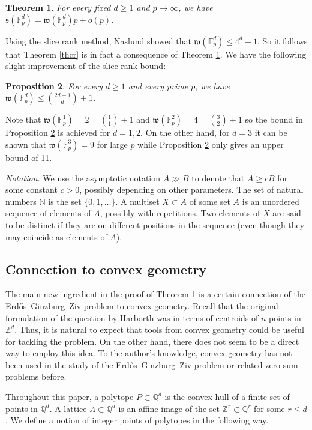 \documentclass{daj}
\renewcommand{\le}{\leqslant}
\renewcommand{\ge}{\geqslant}
\newcommand{\s}{\mathfrak s}
\newcommand{\w}{\mathfrak w}
\newcommand{\Q}{\mathbb Q}
\newcommand{\Z}{\mathbb Z}
\newcommand{\N}{\mathbb N}
\newcommand{\FF}{\mathbb F}
\newtheorem{theorem}{Theorem}[section]
\newtheorem{prop}[theorem]{Proposition}
\theoremstyle{definition}
\theoremstyle{remark}
\theoremstyle{definition}
\theoremstyle{definition}
\begin{document}
\begin{theorem}\label{main}
For every fixed $d \ge 1$ and $p \rightarrow \infty$, we have $\s(\FF_p^d) =  \w(\FF_p^d) p + o(p)$.
\end{theorem}

Using the slice rank method, Naslund \cite{N} showed that $\w(\FF_p^d) \le 4^d-1$. So it follows that Theorem \ref{thcr} is in fact a consequence of Theorem \ref{main}. We have the following slight improvement of the slice rank bound:
\begin{prop}\label{thw}
For every $d \ge 1$ and every prime $p$, we have $\w(\FF_p^d) \le {2d-1 \choose d} + 1$.
\end{prop}
Note that $\w(\FF_p^1) = 2 = {1 \choose 1}+1$ and $\w(\FF_p^2) = 4 = {3 \choose 2} + 1$ so the bound in Proposition \ref{thw} is achieved for $d = 1, 2$. 
On the other hand, for $d=3$ it can be shown that $\w(\FF_p^3) = 9$ for large $p$ while Proposition \ref{thw} only gives an upper bound of 11.


{\em Notation.} We use the asymptotic notation $A \gg B$ to denote that $A \ge c B$ for some constant $c > 0$, possibly depending on other parameters. The set of natural numbers $\N$ is the set $\{0, 1, \ldots\}$. A multiset $X \subset A$ of some set $A$ is an unordered sequence of elements of $A$, possibly with repetitions. Two elements of $X$ are said to be distinct if they are on different positions in the sequence (even though they may coincide as elements of $A$).

\subsection{Connection to convex geometry} 

The main new ingredient in the proof of Theorem \ref{main} is a certain connection of the Erd{\H o}s--Ginzburg--Ziv problem to convex geometry. Recall that the original formulation of the question by Harborth was in terms of centroids of $n$ points in $\Z^d$. Thus, it is natural to expect that tools from convex geometry could be useful for tackling the problem. On the other hand, there does not seem to be a direct way to employ this idea. To the author's knowledge, convex geometry has not been used in the study of the Erd{\H o}s--Ginzburg--Ziv problem or related zero-sum problems before.

Throughout this paper, a polytope $P \subset \Q^d$ is the convex hull of a finite set of points in $\Q^d$. A lattice $\Lambda \subset \Q^d$ is an affine image of the set $\Z^r \subset \Q^r$ for some $r \le d$. We define a notion of integer points of polytopes in the following way.
\end{document}
